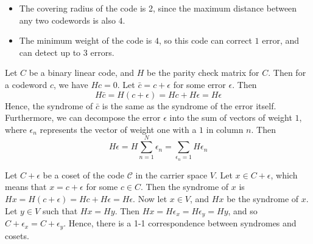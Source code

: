 \documentclass{homework}
\renewcommand{\C}{\mathcal{C}}
\begin{document}
\begin{problem}
\begin{itemize}
    \item
      The covering radius of the code is 2, since the maximum distance between
      any two codewords is also $4$.

    \item
      The minimum weight of the code is $4$, so this code can correct $1$ error,
      and can detect up to $3$ errors.
  \end{itemize}
\end{problem}

\begin{problem}
  Let $C$ be a binary linear code, and $H$ be the parity check matrix for $C$.
  Then for a codeword $c$, we have $Hc = 0$. Let $\bar{c} = c + \epsilon$ for
  some error  $\epsilon$. Then \[
    H\bar{c} = H(c+\epsilon) = Hc+H\epsilon = H\epsilon
  \]
  Hence, the syndrome of $\bar{c}$ is the same as the syndrome of the error
  itself. Furthermore, we can decompose the error $\epsilon$ into the
  sum of vectors of weight $1$, where $\epsilon_n$ represents the vector of
  weight one with a $1$ in column $n$. Then
  \[
    H\epsilon = H{\sum\limits_{n=1}^{N} \epsilon_n} =
    {\sum\limits_{\epsilon_n=1}^{} H\epsilon_n}
  \]
\end{problem}
\begin{problem}
  Let $C+\epsilon$ be a coset of the code $\C$ in the carrier space $V$. Let $x
  \in C+\epsilon$, which means that $x = c + \epsilon$ for some $c \in C$. Then
  the syndrome of  $x$ is $Hx = H(c+\epsilon) = Hc+H\epsilon=H\epsilon$. Now let
  $x \in V$, and $Hx$ be the syndrome of $x$. Let $y \in V$ such that $Hx = Hy$.
  Then $Hx = H\epsilon_x = H\epsilon_y = Hy$, and so  $C+\epsilon_x =
  C+\epsilon_y$. Hence, there is a 1-1 correspondence between syndromes and
  cosets.
\end{problem}
\end{document}
